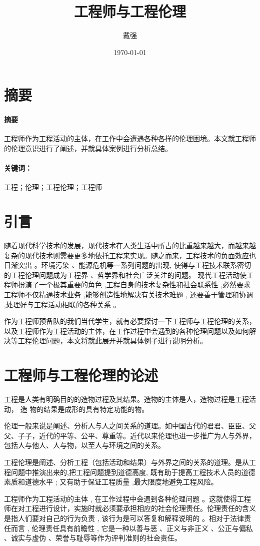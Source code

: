 \documentclass[a4paper,12pt]{ctexart}
\title{工程师与工程伦理}
\author{戴强}
\date{\today}
\renewenvironment*{abstract}[1]{%
\newcommand\gjc{#1}
\paragraph{摘要}
}{\paragraph{关键词：}\gjc }
\begin{document}
\maketitle
\newpage
\tableofcontents
\newpage
\section{摘要}
\quad
\quad

\begin{abstract}{工程；伦理；工程伦理；工程师}
  工程师作为工程活动的主体，在工作中会遭遇各种各样的伦理困境。本文就工程师的伦理意识进行了阐述，并就具体案例进行分析总结。
\end{abstract}

\newpage
\section{引言}
随着现代科学技术的发展，现代技术在人类生活中所占的比重越来越大，而越来越复杂的现代技术则需要更多地依托工程来实现。随之而来，工程技术的负面效应也日渐突出 。环境污染 、能源危机等一系列问题的出现, 使得与工程技术联系密切的工程伦理问题成为工程界 、哲学界和社会广泛关注的问题。
现代工程活动使工程师扮演了一个极其重要的角色 ,工程自身的技术复杂性和社会联系性 ,必然要求工程师不仅精通技术业务 ,能够创造性地解决有关技术难题 , 还要善于管理和协调 ,处理好与工程活动相联的各种关系 。

作为工程师预备队的我们当代学生，就有必要探讨一下工程师与工程伦理的关系，以及工程师作为工程活动的主体，在工作过程中会遇到的各种伦理问题以及如何解决等工程伦理问题，本文将就此展开并就具体例子进行说明分析。
\section{工程师与工程伦理的论述}
工程是人类有明确目的的造物过程及其结果。造物的主体是人，造物过程是工程活动， 造
物的结果是成形的具有特定功能的物。


伦理一般来说是阐述、分析人与人之间关系的道理。如中国古代的君君、臣臣、父父、子子，近代的平等、公平、尊重等。近代以来伦理也进一步推广为人与外界，包括人与他人、人与物，以至人与环境之间的关系。

工程伦理是阐述、分析工程（包括活动和结果）与外界之间的关系的道理。是从工程问题中推演出来的,把工程问题提到道德高度, 既有助于提高工程技术人员的道德素质和道德水平 ; 又有助于保证工程质量 ,最大限度地避免工程风险。

工程师作为工程活动的主体 , 在工作过程中会遇到各种伦理问题 。这就使得工程师在对工程进行设计，实施时就必须要承担相应的社会伦理责任。伦理责任的含义是指人们要对自己的行为负责 , 该行为是可以答复和解释说明的 。相对于法律责任而言 , 伦理责任具有前瞻性 , 它是一种以善与恶 、正义与非正义 、公正与偏私 、诚实与虚伪 、荣誉与耻辱等作为评判准则的社会责任。
\end{document}
